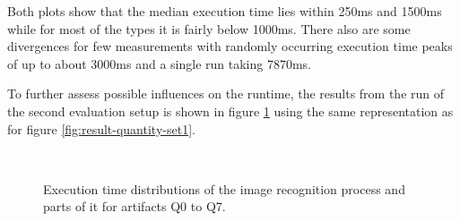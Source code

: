 Both plots show that the median execution time lies within 250ms and 1500ms while for most of the types it is fairly below 1000ms. There also are some divergences for few measurements with randomly occurring execution time peaks of up to about 3000ms and a single run taking 7870ms.

To further assess possible influences on the runtime, the results from the run of the second evaluation setup is shown in figure \ref{fig:result-quantity} using the same representation as for figure \ref{fig:result-quantity-set1}.

\begin{figure}[h!]
	\centering
	\qquad
	\\
	\qquad
	\caption{Execution time distributions of the image recognition process and parts of it for artifacts Q0 to Q7.}\label{fig:result-quantity}
\end{figure}

